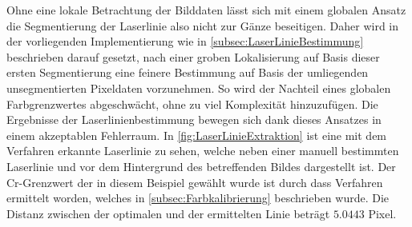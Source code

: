 Ohne eine lokale Betrachtung der Bilddaten lässt sich mit einem globalen Ansatz die Segmentierung der Laserlinie also nicht zur  Gänze beseitigen. Daher wird in der vorliegenden Implementierung wie in \ref{subsec:LaserLinieBestimmung} beschrieben darauf gesetzt, nach einer groben Lokalisierung auf Basis dieser ersten Segmentierung eine feinere Bestimmung auf Basis der umliegenden unsegmentierten Pixeldaten vorzunehmen. So wird der Nachteil eines globalen Farbgrenzwertes abgeschwächt, ohne zu viel Komplexität hinzuzufügen. Die Ergebnisse der Laserlinienbestimmung bewegen sich dank dieses Ansatzes in einem akzeptablen Fehlerraum. In \ref{fig:LaserLinieExtraktion} ist eine mit dem Verfahren erkannte Laserlinie zu sehen, welche neben einer manuell bestimmten Laserlinie und vor dem Hintergrund des betreffenden Bildes dargestellt ist. Der Cr-Grenzwert der in diesem Beispiel gewählt wurde ist durch dass Verfahren ermittelt worden, welches in \ref{subsec:Farbkalibrierung} beschrieben wurde. Die Distanz zwischen der optimalen und der ermittelten Linie beträgt \(5.0443\) Pixel.

